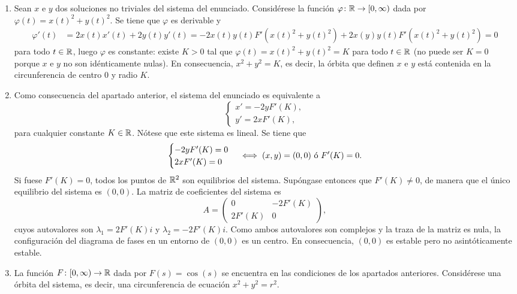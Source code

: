 \documentclass[11pt]{report}
\begin{document}
\begin{solution}
    \hfill
    \begin{enumerate}
        \item Sean $x$ e $y$ dos soluciones no triviales del sistema del enunciado. Considérese la función $\varphi \colon \mathbb R \to [0,\infty)$ dada por $\varphi(t) = x(t)^2+y(t)^2$. Se tiene que $\varphi$ es derivable y
        \begin{align*}
            \varphi'(t) &= 2x(t)x'(t)+2y(t)y'(t) = -2x(t)y(t)F'(x(t)^2+y(t)^2)+2x(y)y(t)F'(x(t)^2+y(t)^2) = 0
        \end{align*}
        para todo $t \in \mathbb R$, luego $\varphi$ es constante: existe $K > 0$ tal que $\varphi(t)=x(t)^2+y(t)^2=K$ para todo $t \in \mathbb R$ (no puede ser $K=0$ porque $x$ e $y$ no son idénticamente nulas). En consecuencia, $x^2+y^2=K$, es decir, la órbita que definen $x$ e $y$ está contenida en la circunferencia de centro $0$ y radio $K$.
        \item Como consecuencia del apartado anterior, el sistema del enunciado es equivalente a
        \[\begin{cases}
            x' = -2yF'(K), \\
            y' = 2xF'(K),
        \end{cases}\] 
        para cualquier constante $K\in\mathbb R$. Nótese que este sistema es lineal. Se tiene que
        \[\begin{cases}
            -2yF'(K) = 0 \\
            2xF'(K) = 0
        \end{cases} \iff 
        (x,y)=(0,0) \textup{ ó } F'(K) = 0.
        \]
        Si fuese $F'(K) = 0$, todos los puntos de $\mathbb R^2$ son equilibrios del sistema. Supóngase entonces que $F'(K)\neq0$, de manera que el único equilibrio del sistema es $(0,0)$. La matriz de coeficientes del sistema es
        \[A = \left(\begin{array}{cc}
            0 & -2F'(K) \\
            2F'(K) & 0
        \end{array}\right),\]
        cuyos autovalores son $\lambda_1 = 2F'(K)i$ y $\lambda_2 = -2F'(K)i$. Como ambos autovalores son complejos y la traza de la matriz es nula, la configuración del diagrama de fases en un entorno de $(0,0)$ es un centro. En consecuencia, $(0,0)$ es estable pero no asintóticamente estable.
        \item La función $F\colon[0,\infty)\to\mathbb R$ dada por $F(s)=\cos(s)$ se encuentra en las condiciones de los apartados anteriores. Considérese una órbita del sistema, es decir, una circunferencia de ecuación $x^2+y^2=r^2$.

\end{enumerate}
\end{solution}
\end{document}
